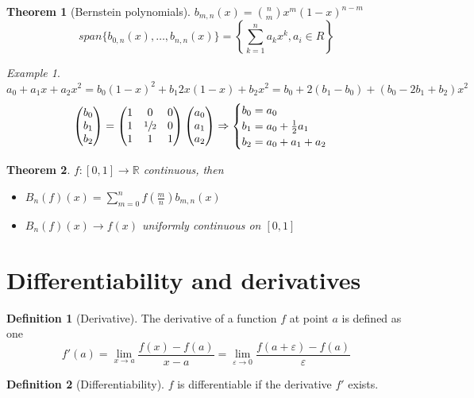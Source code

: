\documentclass{article}
\newcommand{\DS}{\displaystyle}
\newcommand{\Ar}{\Rightarrow}
\newcommand{\f}[3]{#1 : #2 \rightarrow #3}
\newcommand{\intcc}[1]{\left[#1\right]}
\newcommand{\lime}{\lim_{\varepsilon \to 0}}
\newcommand{\limx}[1]{\lim_{x \to #1}}
\theoremstyle{definition}
\newtheorem{definition}{Definition}[section]
\theoremstyle{definition}
\theoremstyle{plain}
\newtheorem{theorem}{Theorem}[section]
\theoremstyle{plain}
\theoremstyle{plain}
\theoremstyle{plain}
\theoremstyle{definition}
\theoremstyle{remark}
\theoremstyle{remark}
\theoremstyle{remark}
\newtheorem{examplet}{Example}[theorem]
\theoremstyle{remark}
\newcommand{\R}{\mathbb{R}}
\newcommand{\sumn}{\sum_{k=1}^n}
\newcommand{\E}{\varepsilon}
\newcommand{\vecThree}[3]{\begin{pmatrix}#1\\#2\\#3\end{pmatrix}}
\begin{document}
\begin{theorem}[Bernstein polynomials]
  $b_{m,n}(x) = \binom{n}{m} x^m (1-x)^{n-m}$
  \[
  span \{ b_{0,n}(x), \hdots, b_{n,n}(x) \} =
  \left\{ \sumn a_k x^k, a_i \in R \right\}
  \]
\end{theorem}

\begin{examplet}
  \[
  a_0 + a_1x + a_2 x^2 = b_0 (1 - x)^2 + b_1 2x (1-x) + b_2 x^2 =
  b_0 + 2 (b_1 - b_0) + (b_0 - 2b_1 + b_2) x^2
  \]
  \[
  \vecThree{b_0}{b_1}{b_2} =
  \begin{pmatrix}
    1 & 0 & 0 \\
    1 & \sfrac{1}{2} & 0 \\
    1 & 1 & 1
  \end{pmatrix} \vecThree{a_0}{a_1}{a_2} \Ar
  \begin{cases}
    b_0 = a_0 \\
    b_1 = a_0 + \frac{1}{2} a_1 \\
    b_2 = a_0 + a_1 + a_2
  \end{cases}
  \]
\end{examplet}


\begin{theorem}
  $\f{f}{\intcc{0,1}}{\R}$ continuous, then
  \begin{itemize}
  \item $\DS B_n(f)(x) = \sum_{m=0}^{n} f(\frac{m}{n}) b_{m,n}(x)$
  \item $B_n(f)(x) \to f(x)$ uniformly continuous on $\intcc{0,1}$
  \end{itemize}
\end{theorem}


\section{Differentiability and derivatives}


\begin{definition}[Derivative]
  The derivative of a function $f$ at point $a$ is defined as one
  \[
  f'(a) = \limx{a} \frac{f(x)-f(a)}{x-a} = \lime \frac{f(a+\E)-f(a)}{\E}
  \]
\end{definition}


\begin{definition}[Differentiability]
  $f$ is differentiable if the derivative $f'$ exists.
\end{definition}
\end{document}
